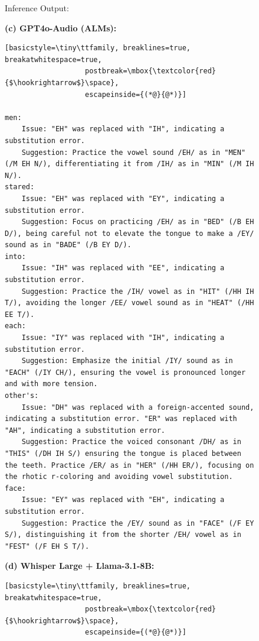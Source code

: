 \documentclass[11pt]{article}
\begin{document}
\begin{figure}[ht]
\begin{AIBox_2}{Inference Output:}
\begin{minipage}[t]{\textwidth}
{\bf (c) GPT4o-Audio (ALMs):} \scriptsize
\begin{lstlisting}[basicstyle=\tiny\ttfamily, breaklines=true, breakatwhitespace=true,
                   postbreak=\mbox{\textcolor{red}{$\hookrightarrow$}\space},
                   escapeinside={(*@}{@*)}]

men: 
    Issue: "EH" was replaced with "IH", indicating a substitution error. 
    Suggestion: Practice the vowel sound /EH/ as in "MEN" (/M EH N/), differentiating it from /IH/ as in "MIN" (/M IH N/).
stared: 
    Issue: "EH" was replaced with "EY", indicating a substitution error. 
    Suggestion: Focus on practicing /EH/ as in "BED" (/B EH D/), being careful not to elevate the tongue to make a /EY/ sound as in "BADE" (/B EY D/).
into: 
    Issue: "IH" was replaced with "EE", indicating a substitution error. 
    Suggestion: Practice the /IH/ vowel as in "HIT" (/HH IH T/), avoiding the longer /EE/ vowel sound as in "HEAT" (/HH EE T/).
each: 
    Issue: "IY" was replaced with "IH", indicating a substitution error. 
    Suggestion: Emphasize the initial /IY/ sound as in "EACH" (/IY CH/), ensuring the vowel is pronounced longer and with more tension.
other's: 
    Issue: "DH" was replaced with a foreign-accented sound, indicating a substitution error. "ER" was replaced with "AH", indicating a substitution error. 
    Suggestion: Practice the voiced consonant /DH/ as in "THIS" (/DH IH S/) ensuring the tongue is placed between the teeth. Practice /ER/ as in "HER" (/HH ER/), focusing on the rhotic r-coloring and avoiding vowel substitution.
face: 
    Issue: "EY" was replaced with "EH", indicating a substitution error. 
    Suggestion: Practice the /EY/ sound as in "FACE" (/F EY S/), distinguishing it from the shorter /EH/ vowel as in "FEST" (/F EH S T/).
\end{lstlisting}
\end{minipage}

\tcbline

\begin{minipage}[t]{\textwidth}
{\bf (d) Whisper Large + Llama-3.1-8B:} \scriptsize
\begin{lstlisting}[basicstyle=\tiny\ttfamily, breaklines=true, breakatwhitespace=true,
                   postbreak=\mbox{\textcolor{red}{$\hookrightarrow$}\space},
                   escapeinside={(*@}{@*)}]


\end{lstlisting}
\end{minipage}
\end{AIBox_2}
\end{figure}
\end{document}
